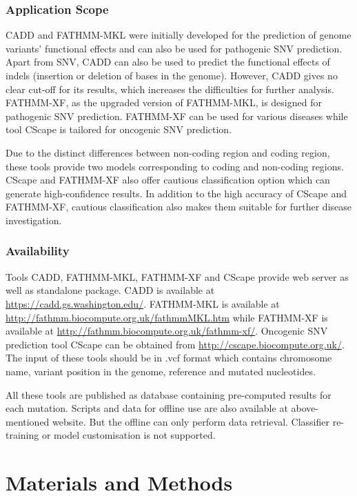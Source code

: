 \documentclass[a4paper,nohyper,nobib,openany,justified]{tufte-book}
\begin{document}
\begin{fullwidth}
\section{Application Scope}

CADD and FATHMM-MKL were initially developed for the prediction of genome variants' functional effects and can also be used for pathogenic SNV prediction. Apart from SNV, CADD can also be used to predict the functional effects of indels (insertion or deletion of bases in the genome). However, CADD gives no clear cut-off for its results, which increases the difficulties for further analysis. FATHMM-XF, as the upgraded version of FATHMM-MKL, is designed for pathogenic SNV prediction. FATHMM-XF can be used for various diseases while tool CScape is tailored for oncogenic SNV prediction.

Due to the distinct differences between non-coding region and coding region, these tools provide two models corresponding to coding and non-coding regions. CScape and FATHMM-XF also offer cautious classification option which can generate high-confidence results. In addition to the high accuracy of CScape and FATHMM-XF, cautious classification also makes them suitable for further disease investigation.

\section{Availability}

Tools CADD, FATHMM-MKL, FATHMM-XF and CScape provide web server as well as standalone package. CADD is available at \url{https://cadd.gs.washington.edu/}. FATHMM-MKL is available at \url{http://fathmm.biocompute.org.uk/fathmmMKL.htm} while FATHMM-XF is available at \url{http://fathmm.biocompute.org.uk/fathmm-xf/}. Oncogenic SNV prediction tool CScape can be obtained from \url{http://cscape.biocompute.org.uk/}. The input of these tools should be in .vcf format which contains chromosome name, variant position in the genome, reference and mutated nucleotides.

All these tools are published as database containing pre-computed results for each mutation. Scripts and data for offline use are also available at above-mentioned website. But the offline can only perform data retrieval. Classifier re-training or model customisation is not supported.

\part{Materials and Methods}


\end{fullwidth}
\end{document}
